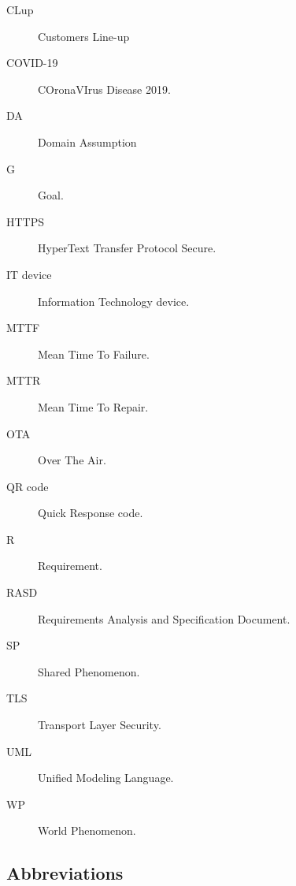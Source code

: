 \documentclass[../../main.tex]{subfiles}
\begin{document}
\begin{description}
    
    \item[CLup] Customers Line-up
    
    \item[COVID-19] COronaVIrus Disease 2019.
    
    \item[DA] Domain Assumption
    
    \item[G] Goal.

    \item[HTTPS] HyperText Transfer Protocol Secure.
    
    \item[IT device] Information Technology device.

    \item[MTTF] Mean Time To Failure.

    \item[MTTR] Mean Time To Repair.

    \item[OTA] Over The Air.
    
    \item[QR code] Quick Response code.

    \item[R] Requirement. 
    
    \item[RASD] Requirements Analysis and Specification Document.
    
    \item[SP] Shared Phenomenon.

    \item[TLS] Transport Layer Security.
    
    \item[UML] Unified Modeling Language.
    
    \item[WP] World Phenomenon.
\end{description}

\subsection{Abbreviations}
\end{document}
